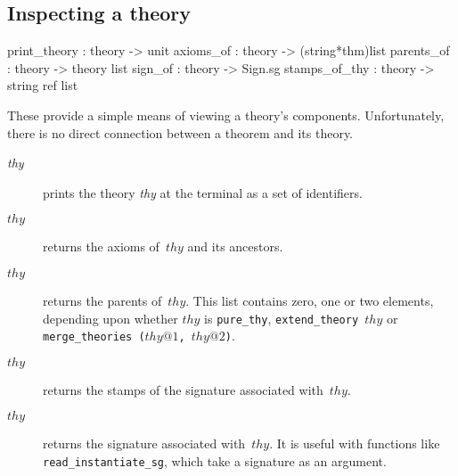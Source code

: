 \subsection{Inspecting a theory}
\begin{ttbox} 
print_theory  : theory -> unit
axioms_of     : theory -> (string*thm)list
parents_of    : theory -> theory list
sign_of       : theory -> Sign.sg
stamps_of_thy : theory -> string ref list
\end{ttbox}
These provide a simple means of viewing a theory's components.
Unfortunately, there is no direct connection between a theorem and its
theory.
\begin{description}
\item[ {\it thy}]  
prints the theory {\it thy\/} at the terminal as a set of identifiers.

\item[ $thy$] 
returns the axioms of~$thy$ and its ancestors.

\item[ $thy$] 
returns the parents of~$thy$.  This list contains zero, one or two
elements, depending upon whether $thy$ is {\tt pure_thy}, 
\hbox{\tt extend_theory $thy$} or \hbox{\tt merge_theories ($thy@1$, $thy@2$)}.

\item[ $thy$]
returns the stamps of the signature associated with~$thy$.

\item[ $thy$] 
returns the signature associated with~$thy$.  It is useful with functions
like {\tt read_instantiate_sg}, which take a signature as an argument.
\end{description}


